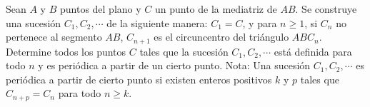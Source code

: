 Sean $A$ y $B$ puntos del plano y $C$ un punto de la mediatriz de $AB$. Se construye una sucesión $C_1, C_2, \cdots$ de la siguiente manera: $C_1 = C$, y para $n \geq 1$, si $C_n$ no pertenece al segmento $AB$, $C_{n+1}$ es el circuncentro del triángulo $ABC_n$. \newline 
Determine todos los puntos $C$ tales que la sucesión $C_1, C_2, \cdots$ está definida para todo $n$ y es periódica a partir de un cierto punto. \newline 
Nota: Una sucesión $C_1, C_2, \cdots$ es periódica a partir de cierto punto si existen enteros positivos $k$ y $p$ tales que $C_{n+p} = C_n$ para todo $n \geq k$.
